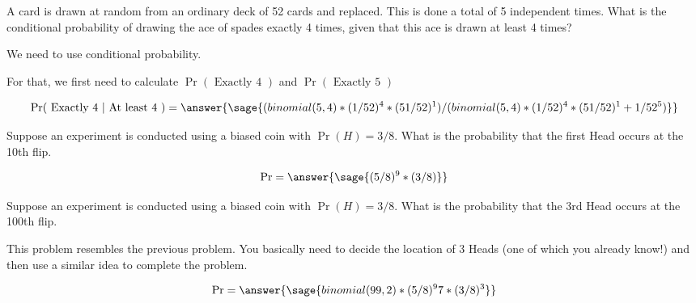 \documentclass{ximera}
\begin{document}
\begin{problem}
A card is drawn at random from an ordinary deck of 52 cards and replaced. This is done a total of 5 independent times. What is the conditional probability of drawing the ace of spades exactly 4 times, given that this ace is drawn at least 4 times?
\begin{hint}
    \item We need to use conditional probability.
    \item For that, we first need to calculate 
$
\Pr(\text{ Exactly 4 })$
and
$
\Pr(\text{ Exactly 5 })
$
\end{hint}

\begin{prompt}
$$
\Pr(\text{ Exactly 4 } | \text{ At least 4 })
=
\answer{
\sage{(binomial(5,4)*(1/52)^4*(51/52)^1)/(binomial(5,4)*(1/52)^4*(51/52)^1+1/52^5)}
}
$$
\end{prompt}

\end{problem}

\begin{problem}
Suppose an experiment is conducted using a biased coin with $\Pr(H)=3/8$. What is the probability that the first Head occurs at the 10th flip.

\begin{prompt}
$$
\Pr=\answer{\sage{(5/8)^9*(3/8)}}
$$
\end{prompt}

\end{problem}

\begin{problem}
Suppose an experiment is conducted using a biased coin with $\Pr(H)=3/8$. What is the probability that the 3rd Head occurs at the 100th flip.
\begin{hint}
This problem resembles the previous problem. You basically need to decide the location of 3 Heads (one of which you already know!) and then use a similar idea to complete the problem.
\end{hint}
\begin{prompt}
$$
\Pr=\answer{\sage{binomial(99,2)*(5/8)^97*(3/8)^3}}
$$
\end{prompt}

\end{problem}
\end{document}
